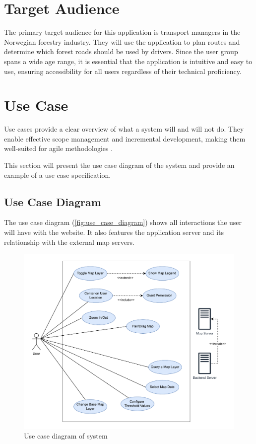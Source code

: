 \section{Target Audience}

The primary target audience for this application is transport managers in the Norwegian forestry industry. They will use the application to plan routes and determine which forest roads should be used by drivers. Since the user group spans a wide age range, it is essential that the application is intuitive and easy to use, ensuring accessibility for all users regardless of their technical proficiency.

\section{Use Case}

Use cases provide a clear overview of what a system will and will not do. They enable effective scope management and incremental development, making them well-suited for agile methodologies \cite{jacobson_use_case}. 

This section will present the use case diagram of the system and provide an example of a use case specification.

\subsection{Use Case Diagram}
The use case diagram (\autoref{fig:use_case_diagram}) shows all interactions the user will have with the website. It also features the application server and its relationship with the external map servers.



\begin{figure}[h]
    \centering
    \includegraphics[width=1\linewidth]{figures/skogkurs_use_case.pdf}
    \caption{Use case diagram of system}
    \label{fig:use_case_diagram}
\end{figure}

